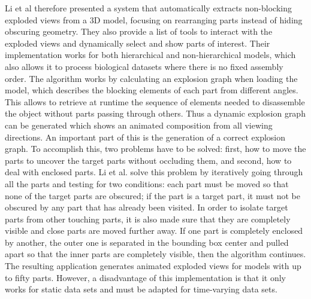 Li et al therefore presented a system that automatically extracts non-blocking exploded views from a 3D model, focusing on rearranging parts instead of hiding obscuring geometry. %
They also provide a list of tools to interact with the exploded views and dynamically select and show parts of interest.
Their implementation works for both hierarchical and non-hierarchical models, which also allows it to process biological datasets where there is no fixed assembly order.  %
The algorithm works by calculating an explosion graph when loading the model, which describes the blocking elements of each part from different angles. 
This allows to retrieve at runtime the sequence of elements needed to disassemble the object without parts passing through others. 
Thus a dynamic explosion graph can be generated which shows an animated composition from all viewing directions.
An important part of this is the generation of a correct explosion graph. 
To accomplish this, two problems have to be solved: first, how to move the parts to uncover the target parts without occluding them, and second, how to deal with enclosed parts. 
Li et al. solve this problem by iteratively going through all the parts and testing for two conditions: each part must be moved so that none of the target parts are obscured; if the part is a target part, it must not be obscured by any part that has already been visited. 
In order to isolate target parts from other touching parts, it is also made sure that they are completely visible and close parts are moved further away. 
If one part is completely enclosed by another, the outer one is separated in the bounding box center and pulled apart so that the inner parts are completely visible, then the algorithm continues. %
The resulting application generates animated exploded views for models with up to fifty parts. 
However, a disadvantage of this implementation is that it only works for static data sets and must be adapted for time-varying data sets.